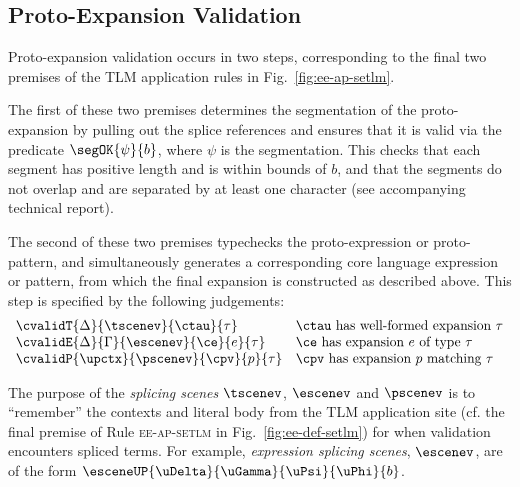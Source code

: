 \documentclass[acmsmall]{acmart}
\begin{document}

\subsection{Proto-Expansion Validation}\label{sec:ce-validation-U}\label{sec:ce-syntax-U}\label{sec:s-PEV}
Proto-expansion validation occurs in two steps, corresponding to the final two premises of the TLM application rules in Fig.~\ref{fig:ee-ap-setlm}. 

The first of these two premises determines the segmentation of the proto-expansion by pulling out the splice references and ensures that it is valid via the predicate $\segOK{\psi}{b}$, where $\psi$ is the segmentation. This checks that each segment  has positive length and is within bounds of $b$, and that the segments do not overlap and are separated by at least one character (see accompanying technical report).

The second of these two premises {typechecks} the proto-expression or proto-pattern, and simultaneously generates a corresponding core language expression or pattern, from which the final expansion is constructed as described above. This step is specified by the following judgements:%
\[\begin{array}{ll}
\cvalidT{\Delta}{\tscenev}{\ctau}{\tau} & \text{$\ctau$ has well-formed expansion $\tau$}\\
\cvalidE{\Delta}{\Gamma}{\escenev}{\ce}{e}{\tau} & \text{$\ce$ has expansion $e$ of type $\tau$}\\
\cvalidP{\upctx}{\pscenev}{\cpv}{p}{\tau} & \text{$\cpv$ has expansion $p$ matching $\tau$}
\end{array}\]



The purpose of the \emph{splicing scenes} $\tscenev$, $\escenev$ and $\pscenev$ is to ``remember'' the contexts and literal body from the TLM application site (cf. the final premise of Rule \textsc{ee-ap-setlm} in Fig.~\ref{fig:ee-def-setlm}) for when validation encounters spliced terms. For example, \emph{expression splicing scenes}, $\escenev$, are of the form $\esceneUP{\uDelta}{\uGamma}{\uPsi}{\uPhi}{b}$.
\end{document}
